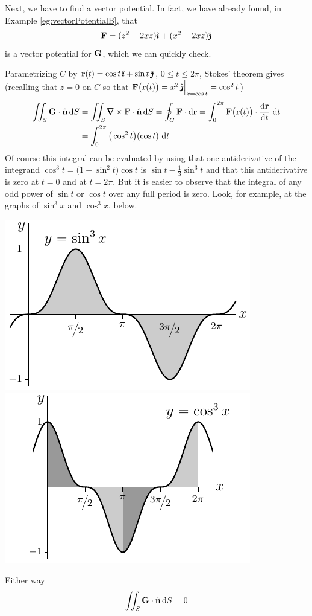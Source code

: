 \begin{eg}
Next, we have to find a vector potential.
In fact, we have already found, in Example \ref{eg:vectorPotentialB}, that
\begin{equation*}
\mathbf{F} = (z^2-2xz) \hat{\pmb{\imath}} +(x^2-2xz)\hat{\pmb{\jmath}}
\end{equation*}
is a vector potential for $\mathbf{G}$, which we can quickly check.

Parametrizing $C$ by
$\mathbf{r}(t) = \cos t\,\hat{\pmb{\imath}}+\sin t\,\hat{\pmb{\jmath}}$, $0\le t\le 2\pi$,
Stokes' theorem gives (recalling that $z=0$ on $C$ so that
$\mathbf{F}\big(\mathbf{r}(t)\big)=x^2\,\hat{\pmb{\jmath}}\Big|_{x=\cos t}=\cos^2t$)
\begin{align*}
\dblInt_S\vG\cdot\hn\,\dee{S}
&= \dblInt_S\vnabla\times\vF\cdot\hn\,\dee{S}
= \oint_C \vF\cdot\dee{\vr}
=\int_0^{2\pi} \vF\big(\vr(t)\big)\cdot\diff{\vr}{t}\ \dee{t} \\
&= \int_0^{2\pi} \big(\cos^2 t\big)(\cos t)\ \dee{t}
\end{align*} 
Of course this integral can be evaluated by using that
one antiderivative of the integrand $\cos^3 t =\big(1-\sin^2t\big)\cos t$
is $\sin t-\frac{1}{3}\sin^3 t$ and that this antiderivative 
is zero at $t=0$ and at $t=2\pi$. But it is easier to observe that the
integral of any odd power of $\sin t$ or $\cos t$ over any full period
is zero. Look, for example, at the graphs of $\sin^3x$ and $\cos^3x$, below.
\begin{wfig}
\begin{center}
    \includegraphics{sin3Graph.pdf}\qquad\quad
    \includegraphics{cos3Graph.pdf}
\end{center}
\end{wfig}
Either way
\begin{align*}
\iint_S\mathbf{G}\cdot\hat{\mathbf{n}}\,\mathrm{d}S
=0
\end{align*} 
\end{eg}
